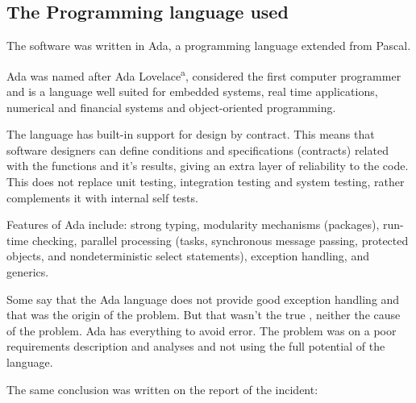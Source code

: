 \documentclass[
12pt, %
a4paper, %
oneside, %
headinclude,footinclude, %
BCOR5mm, %
]{scrartcl}
\begin{document}
\subsection{The Programming language used}

The software was written in Ada, a programming language extended from Pascal\cite{ada:wikipedia}.

Ada was named after Ada Lovelace\textsuperscript{a}, considered the first computer programmer and is a language well suited for embedded systems, real time applications, numerical and financial systems and object-oriented programming. 

The language has built-in support for design by contract. This means that software designers can define conditions and specifications (contracts) related with the functions and it's results, giving an extra layer of reliability to the code. This does not replace unit testing, integration testing and system testing, rather complements it with internal self tests. 

Features of Ada include: strong typing, modularity mechanisms (packages), run-time checking, parallel processing (tasks, synchronous message passing, protected objects, and nondeterministic select statements), exception handling, and generics.

Some say that the Ada language does not provide good exception handling and that was the origin of the problem. But that wasn't the true \cite{programingProblem:PeterB}, neither the cause of the problem. Ada has everything to avoid error. The problem was on a poor requirements description and analyses and not using the full potential of the language.

The same conclusion was written on the report of the incident\cite{Report:1996}:


\let\thefootnote\relax{}
\end{document}
